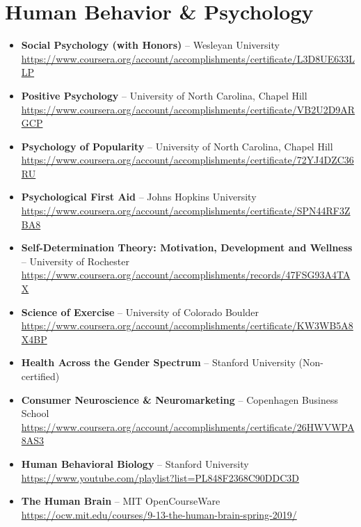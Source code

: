 \documentclass[11pt,a4paper]{article}
\begin{document}
\section{Human Behavior \& Psychology}
\begin{itemize}
    \item \textbf{Social Psychology (with Honors)} – Wesleyan University\\
    \url{https://www.coursera.org/account/accomplishments/certificate/L3D8UE633LLP}

    \item \textbf{Positive Psychology} – University of North Carolina, Chapel Hill\\
    \url{https://www.coursera.org/account/accomplishments/certificate/VB2U2D9ARGCP}

    \item \textbf{Psychology of Popularity} – University of North Carolina, Chapel Hill\\
    \url{https://www.coursera.org/account/accomplishments/certificate/72YJ4DZC36RU}

    \item \textbf{Psychological First Aid} – Johns Hopkins University\\
    \url{https://www.coursera.org/account/accomplishments/certificate/SPN44RF3ZBA8}

    \item \textbf{Self-Determination Theory: Motivation, Development and Wellness} – University of Rochester\\
    \url{https://www.coursera.org/account/accomplishments/records/47FSG93A4TAX}

    \item \textbf{Science of Exercise} – University of Colorado Boulder\\
    \url{https://www.coursera.org/account/accomplishments/certificate/KW3WB5A8X4BP}

    \item \textbf{Health Across the Gender Spectrum} – Stanford University (Non-certified)

    \item \textbf{Consumer Neuroscience \& Neuromarketing} – Copenhagen Business School\\
    \url{https://www.coursera.org/account/accomplishments/certificate/26HWVWPA8AS3}

    \item \textbf{Human Behavioral Biology} – Stanford University\\
    \url{https://www.youtube.com/playlist?list=PL848F2368C90DDC3D}

    \item \textbf{The Human Brain} – MIT OpenCourseWare\\
    \url{https://ocw.mit.edu/courses/9-13-the-human-brain-spring-2019/}
\end{itemize}
\end{document}
